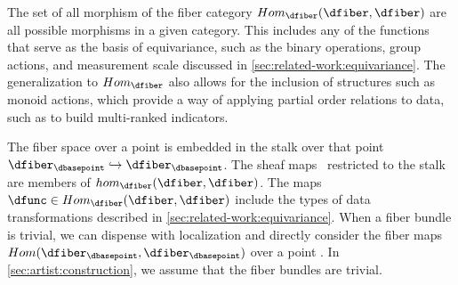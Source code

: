 \documentclass[10pt,journal,compsoc]{IEEEtran}
\theoremstyle{definition}
\theoremstyle{remark}
\begin{document}
The set of all morphism of the fiber category $Hom_{\mathcal{\dfiber}}(\dfiber, \dfiber)$ are all possible morphisms in a given category. This includes any of the functions that serve as the basis of equivariance, such as the binary operations, group actions, and measurement scale discussed in  \autoref{sec:related-work:equivariance}. The generalization to $Hom_\mathcal{\dfiber}$ also allows for the inclusion of structures such as monoid actions\cite{barrCategoryTheoryComputing}, which provide a way of applying partial order relations to data\cite{fongInvitationAppliedCategory2019}, such as to build multi-ranked indicators\cite{bruggemannRankingPrioritizationMultiindicator2011}.

The fiber space over a point is embedded in the stalk over that point $\dfiber_{\dbasepoint}\hookrightarrow \mathscr{\dfiber}_{\dbasepoint}$. The sheaf maps \dfunc\ restricted to the stalk are members of $hom_{\mathcal{\dfiber}}(\dfiber,\dfiber)$. The maps $\dfunc \in Hom_{\mathcal{\dfiber}}(\dfiber,\dfiber)$ include the types of data transformations described in \autoref{sec:related-work:equivariance}. When a fiber bundle is trivial, we can dispense with localization and directly consider the fiber maps $Hom(\dfiber_{\dbasepoint}, \dfiber_{\dbasepoint})$ over a point \dbasepoint. In \autoref{sec:artist:construction}, we assume that the fiber bundles are trivial.
\end{document}
